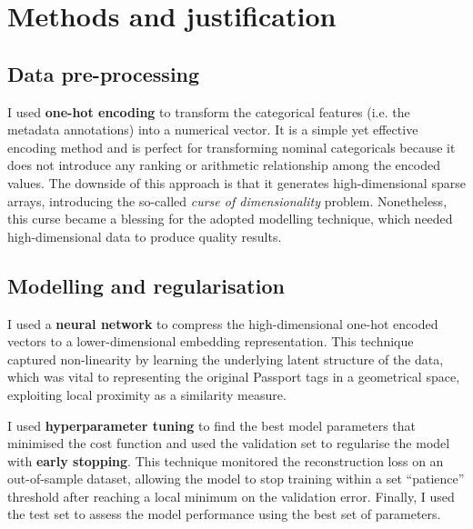 
\section{Methods and justification}

\subsection{Data pre-processing}

I used \textbf{one-hot encoding} to transform the categorical features (i.e. the metadata annotations) into a numerical vector.
It is a simple yet effective encoding method and is perfect for transforming nominal categoricals because it does not introduce
any ranking or arithmetic relationship among the encoded values.
The downside of this approach is that it generates high-dimensional sparse arrays,
introducing the so-called \textit{curse of dimensionality} problem.
Nonetheless, this curse became a blessing for the adopted modelling technique,
which needed high-dimensional data to produce quality results.

\subsection{Modelling and regularisation}

I used a \textbf{neural network} to compress the high-dimensional one-hot encoded vectors to a lower-dimensional embedding representation.
This technique captured non-linearity by learning the underlying latent structure of the data,
which was vital to representing the original Passport tags in a geometrical space,
exploiting local proximity as a similarity measure.

I used \textbf{hyperparameter tuning} to find the best model parameters
that minimised the cost function and used the validation set to regularise the model with \textbf{early stopping}.
This technique monitored the reconstruction loss on an out-of-sample dataset,
allowing the model to stop training within a set ``patience'' threshold after reaching a local minimum on the validation error.
Finally, I used the test set to assess the model performance using the best set of parameters.

